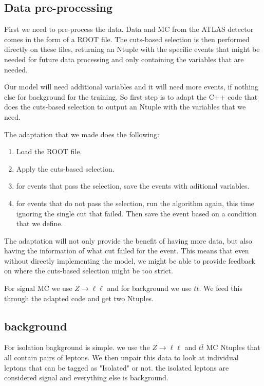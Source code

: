 \documentclass{tufte-book}
\begin{document}
\subsection{Data pre-processing}

First we need to pre-process the data. Data and MC from the ATLAS detector comes in the form of a ROOT file. The cuts-based selection is then performed directly 
on these files, returning an Ntuple with the specific events that might be needed for future data processing and only containing the variables that are needed.

Our model will need additional variables and it will need more events, if nothing else for background for the training.
So first step is to adapt the C++ code that does the cuts-based selection to output an Ntuple with the variables that we need.

The adaptation that we made does the following:
\begin{enumerate}
    \item Load the ROOT file.
    \item Apply the cuts-based selection.
    \item for events that pass the selection, save the events with aditional variables.
    \item for events that do not pass the selection, run the algorithm again, this time ignoring the single cut that failed. Then save the event based on a condition that we define.
\end{enumerate}

The adaptation will not only provide the benefit of having more data, but also having the information of what cut failed for the event. 
This means that even without directly implementing the model, we might be able to provide feedback on where the cuts-based selection might be too strict.


For signal MC we use \(Z\to\ell\ell\) and for background we use \(t\bar{t}\). We feed this through the adapted code and get two Ntuples.


\subsection{background}

For isolation bagkground is simple. we use the \(Z\to\ell\ell\) and \(t\bar{t}\) MC Ntuples that all contain pairs of leptons.
We then unpair this data to look at individual leptons that can be tagged as "Isolated" or not. the isolated leptons are considered signal and everything else is background.
\end{document}
